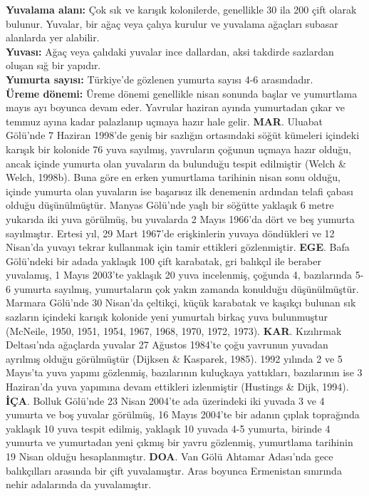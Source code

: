 \documentclass[
  a4paper,
  DIV=11,
  numbers=noendperiod]{scrreprt}
\begin{document}
\textbf{Yuvalama alanı:} Çok sık ve karışık kolonilerde, genellikle 30
ila 200 çift olarak bulunur. Yuvalar, bir ağaç veya çalıya kurulur ve
yuvalama ağaçları subasar alanlarda yer alabilir.\\
\textbf{Yuvası:} Ağaç veya çalıdaki yuvalar ince dallardan, aksi
takdirde sazlardan oluşan sığ bir yapıdır.\\
\textbf{Yumurta sayısı:} Türkiye'de gözlenen yumurta sayısı 4-6
arasındadır.\\
\textbf{Üreme dönemi:} Üreme dönemi genellikle nisan sonunda başlar ve
yumurtlama mayıs ayı boyunca devam eder. Yavrular haziran ayında
yumurtadan çıkar ve temmuz ayına kadar palazlanıp uçmaya hazır hale
gelir. \textbf{MAR}. Uluabat Gölü'nde 7 Haziran 1998'de geniş bir
sazlığın ortasındaki söğüt kümeleri içindeki karışık bir kolonide 76
yuva sayılmış, yavruların çoğunun uçmaya hazır olduğu, ancak içinde
yumurta olan yuvaların da bulunduğu tespit edilmiştir (Welch \& Welch,
1998b). Buna göre en erken yumurtlama tarihinin nisan sonu olduğu,
içinde yumurta olan yuvaların ise başarısız ilk denemenin ardından
telafi çabası olduğu düşünülmüştür. Manyas Gölü'nde yaşlı bir söğütte
yaklaşık 6 metre yukarıda iki yuva görülmüş, bu yuvalarda 2 Mayıs
1966'da dört ve beş yumurta sayılmıştır. Ertesi yıl, 29 Mart 1967'de
erişkinlerin yuvaya döndükleri ve 12 Nisan'da yuvayı tekrar kullanmak
için tamir ettikleri gözlenmiştir. \textbf{EGE}. Bafa Gölü'ndeki bir
adada yaklaşık 100 çift karabatak, gri balıkçıl ile beraber yuvalamış, 1
Mayıs 2003'te yaklaşık 20 yuva incelenmiş, çoğunda 4, bazılarında 5-6
yumurta sayılmış, yumurtaların çok yakın zamanda konulduğu
düşünülmüştür. Marmara Gölü'nde 30 Nisan'da çeltikçi, küçük karabatak ve
kaşıkçı bulunan sık sazların içindeki karışık kolonide yeni yumurtalı
birkaç yuva bulunmuştur (McNeile, 1950, 1951, 1954, 1967, 1968, 1970,
1972, 1973). \textbf{KAR}. Kızılırmak Deltası'nda ağaçlarda yuvalar 27
Ağustos 1984'te çoğu yavrunun yuvadan ayrılmış olduğu görülmüştür
(Dijksen \& Kasparek, 1985). 1992 yılında 2 ve 5 Mayıs'ta yuva yapımı
gözlenmiş, bazılarının kuluçkaya yattıkları, bazılarının ise 3
Haziran'da yuva yapımına devam ettikleri izlenmiştir (Hustings \& Dijk,
1994). \textbf{İÇA}. Bolluk Gölü'nde 23 Nisan 2004'te ada üzerindeki iki
yuvada 3 ve 4 yumurta ve boş yuvalar görülmüş, 16 Mayıs 2004'te bir
adanın çıplak toprağında yaklaşık 10 yuva tespit edilmiş, yaklaşık 10
yuvada 4-5 yumurta, birinde 4 yumurta ve yumurtadan yeni çıkmış bir
yavru gözlenmiş, yumurtlama tarihinin 19 Nisan olduğu hesaplanmıştır.
\textbf{DOA}. Van Gölü Ahtamar Adası'nda gece balıkçılları arasında bir
çift yuvalamıştır. Aras boyunca Ermenistan sınırında nehir adalarında da
yuvalamıştır.
\end{document}
